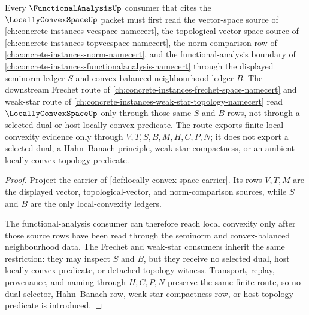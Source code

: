 \begin{theorem}
\label{thm:locally-convex-space-functional-analysis-forward-link}
Every $\FunctionalAnalysisUp$ consumer that cites the $\LocallyConvexSpaceUp$ packet must first read the vector-space source of \autoref{ch:concrete-instances-vecspace-namecert}, the topological-vector-space source of \autoref{ch:concrete-instances-topvecspace-namecert}, the norm-comparison row of \autoref{ch:concrete-instances-norm-namecert}, and the functional-analysis boundary of \autoref{ch:concrete-instances-functionalanalysis-namecert} through the displayed seminorm ledger $S$ and convex-balanced neighbourhood ledger $B$. The downstream Frechet route of \autoref{ch:concrete-instances-frechet-space-namecert} and weak-star route of \autoref{ch:concrete-instances-weak-star-topology-namecert} read $\LocallyConvexSpaceUp$ only through those same $S$ and $B$ rows, not through a selected dual or host locally convex predicate. The route exports finite local-convexity evidence only through $V,T,S,B,M,H,C,P,N$; it does not export a selected dual, a Hahn--Banach principle, weak-star compactness, or an ambient locally convex topology predicate.
\end{theorem}
\begin{proof}
Project the carrier of \autoref{def:locally-convex-space-carrier}. Its rows $V,T,M$ are the displayed vector, topological-vector, and norm-comparison sources, while $S$ and $B$ are the only local-convexity ledgers.

The functional-analysis consumer can therefore reach local convexity only after those source rows have been read through the seminorm and convex-balanced neighbourhood data. The Frechet and weak-star consumers inherit the same restriction: they may inspect $S$ and $B$, but they receive no selected dual, host locally convex predicate, or detached topology witness. Transport, replay, provenance, and naming through $H,C,P,N$ preserve the same finite route, so no dual selector, Hahn--Banach row, weak-star compactness row, or host topology predicate is introduced.
\end{proof}
